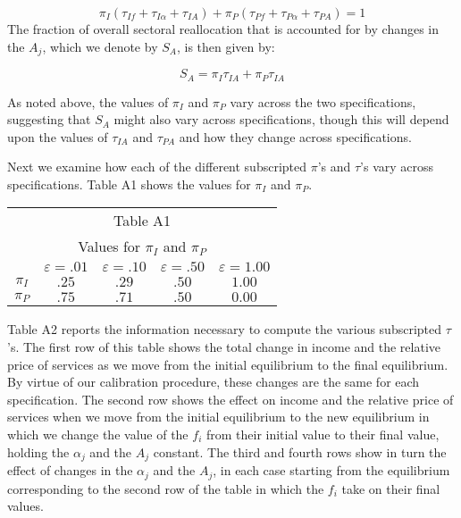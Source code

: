 \documentclass[12pt,english]{article}
\begin{document}
\begin{equation*}
\pi _{I}(\tau _{If}+\tau _{I\alpha }+\tau _{IA})+\pi _{P}(\tau _{Pf}+\tau
_{P\alpha }+\tau _{PA})=1
\end{equation*}%
The fraction of overall sectoral reallocation that is accounted for by
changes in the $A_{j}$, which we denote by $S_{A}$, is then given by:

\begin{equation*}
S_{A}=\pi _{I}\tau _{IA}+\pi _{P}\tau _{IA}
\end{equation*}

As noted above, the values of $\pi _{I}$ and $\pi _{P}$ vary across the two
specifications, suggesting that $S_{A}$ might also vary across
specifications, though this will depend upon the values of $\tau _{IA}$ and $\tau _{PA}$  
and how they change across specifications.

Next we examine how each of the different subscripted $\pi$'s and $\tau$'s vary across
specifications. Table A1 shows the values for $\pi _{I}$ and $\pi _{P}$.

\begin{center}
\begin{tabular}{ccccc}
\multicolumn{5}{c}{Table A1} \\ 
\multicolumn{5}{c}{Values for $\pi _{I}$ and $\pi _{P}$} \\ \hline\hline
& $\varepsilon =.01$ & $\varepsilon =.10$ & $\varepsilon =.50$ & $%
\varepsilon =1.00$ \\ \hline\hline
$\pi _{I}$ & $.25$ & $.29$ & $.50$ & $1.00$ \\ 
$\pi _{P}$ & $.75$ & $.71$ & $.50$ & $0.00$ \\ \hline
\end{tabular}
\end{center}

Table A2 reports the information necessary to compute the various subscripted $\tau$'s. The
first row of this table shows the total change in income and the relative
price of services as we move from the initial equilibrium to the final
equilibrium. By virtue of our calibration procedure, these changes are the
same for each specification. The second row shows the effect on income and
the relative price of services when we move from the initial equilibrium to
the new equilibrium in which we change the value of the $f_{i}$ from their
initial value to their final value, holding the $\alpha _{j}$ and the $A_{j}$
constant. The third and fourth rows show in turn the effect of changes in
the $\alpha _{j}$ and the $A_{j}$, in each case starting from the
equilibrium corresponding to the second row of the table in which the $f_{i}$
take on their final values.
\end{document}
